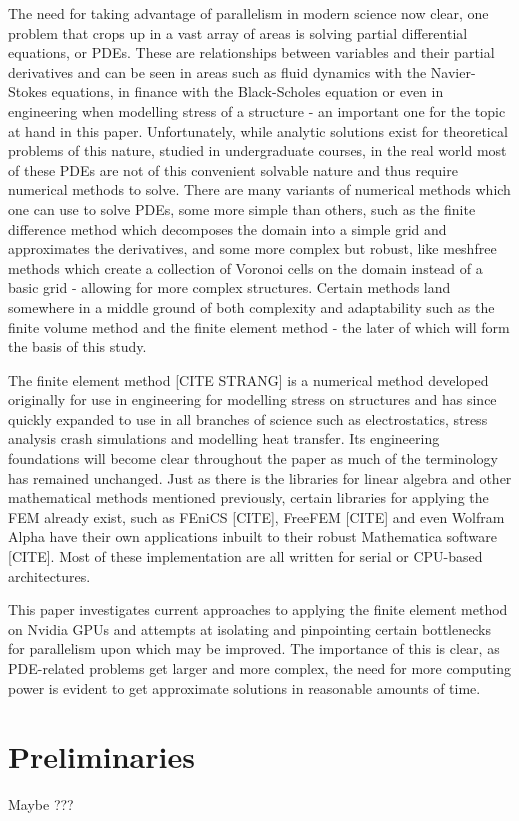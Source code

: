 The need for taking advantage of parallelism in modern science now clear, one problem that crops up in a vast array of areas is solving partial differential equations, or PDEs. These are relationships between variables and their partial derivatives and can be seen in areas such as fluid dynamics with the Navier-Stokes equations, in finance with the Black-Scholes equation or even in engineering when modelling stress of a structure - an important one for the topic at hand in this paper. Unfortunately, while analytic solutions exist for theoretical problems of this nature, studied in undergraduate courses, in the real world most of these PDEs are not of this convenient solvable nature and thus require numerical methods to solve. There are many variants of numerical methods which one can use to solve PDEs, some more simple than others, such as the finite difference method which decomposes the domain into a simple grid and approximates the derivatives, and some more complex but robust, like meshfree methods which create a collection of Voronoi cells on the domain instead of a basic grid - allowing for more complex structures. Certain methods land somewhere in a middle ground of both complexity and adaptability such as the finite volume method and the finite element method - the later of which will form the basis of this study.

The finite element method [CITE STRANG] is a numerical method developed originally for use in engineering for modelling stress on structures and has since quickly expanded to use in all branches of science such as electrostatics, stress analysis crash simulations and modelling heat transfer. Its engineering foundations will become clear throughout the paper as much of the terminology has remained unchanged. Just as there is the libraries for linear algebra and other mathematical methods mentioned previously, certain libraries for applying the FEM already exist, such as FEniCS [CITE], FreeFEM [CITE] and even Wolfram Alpha have their own applications inbuilt to their robust Mathematica software [CITE]. Most of these implementation are all written for serial or CPU-based architectures.

This paper investigates current approaches to applying the finite element method on Nvidia GPUs and attempts at isolating and pinpointing certain bottlenecks for parallelism upon which may be improved. The importance of this is clear, as PDE-related problems get larger and more complex, the  need for more computing power is evident to get approximate solutions in reasonable amounts of time.

\section{Preliminaries}
Maybe ???